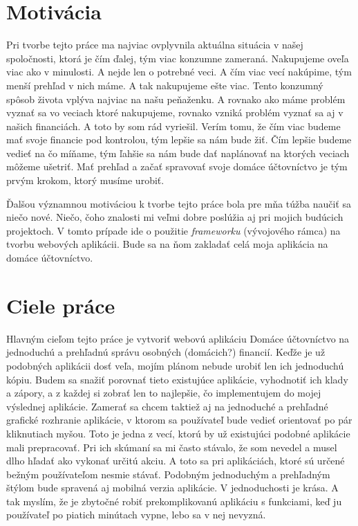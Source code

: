 \documentclass[12pt,onesided]{book}
\begin{document}
\section{Motivácia}
Pri tvorbe tejto práce ma najviac ovplyvnila aktuálna situácia v našej spoločnosti, ktorá je čím ďalej, tým viac konzumne zameraná. Nakupujeme oveľa viac ako v minulosti. A nejde len o potrebné veci. A čím viac vecí nakúpime, tým menší prehľad v nich máme. A tak nakupujeme ešte viac. Tento konzumný spôsob života vplýva najviac na našu peňaženku. A rovnako ako máme problém vyznať sa vo veciach ktoré nakupujeme, rovnako vzniká problém vyznať sa aj v našich financiách. A toto by som rád vyriešil. Verím tomu, že čím viac budeme mať svoje financie pod kontrolou, tým lepšie sa nám bude žiť. Čím lepšie budeme vedieť na čo míňame, tým ľahšie sa nám bude dať naplánovať na ktorých veciach môžeme ušetriť. Mať prehľad a začať spravovať svoje domáce účtovníctvo je tým prvým krokom, ktorý musíme urobiť.

Ďalšou významnou motiváciou k tvorbe tejto práce bola pre mňa túžba naučiť sa niečo nové. Niečo, čoho znalosti mi veľmi dobre poslúžia aj pri mojich budúcich projektoch. V tomto prípade ide o použitie \emph{frameworku} (vývojového rámca) na tvorbu webových aplikácii. Bude sa na ňom zakladať celá moja aplikácia na domáce účtovníctvo.   

\section{Ciele práce}
Hlavným cieľom tejto práce je vytvoriť webovú aplikáciu Domáce účtovníctvo na jednoduchú a prehľadnú správu osobných (domácich?) financií. Keďže je už podobných aplikácii dosť veľa, mojím plánom nebude urobiť len ich jednoduchú kópiu. Budem sa snažiť porovnať tieto existujúce aplikácie, vyhodnotiť ich klady a zápory, a z každej si zobrať len to najlepšie, čo implementujem do mojej výslednej aplikácie. Zamerať sa chcem taktiež aj na jednoduché a prehľadné grafické rozhranie aplikácie, v ktorom sa používateľ bude vedieť orientovať po pár kliknutiach myšou. Toto je jedna z vecí, ktorú by už existujúci podobné aplikácie mali prepracovať. Pri ich skúmaní sa mi často stávalo, že som nevedel a musel dlho hľadať ako vykonať určitú akciu. A toto sa pri aplikáciách, ktoré sú určené bežným používateľom nesmie stávať. Podobným jednoduchým a prehľadným štýlom bude spravená aj mobilná verzia aplikácie. V jednoduchosti je krása. A tak myslím, že je zbytočné robiť prekomplikovanú aplikáciu s  funkciami, keď ju používateľ po piatich minútach vypne, lebo sa v nej nevyzná.
\end{document}
